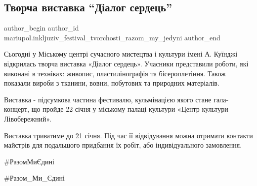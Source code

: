  
 
 
 
 

\subsection{Творча виставка \enquote{Діалог сердець}}
\label{sec:11_01_2022.fb.mariupol.inkljuziv_festival_tvorchosti_razom_my_jedyni.1.tvorcha_vistavka__d_}

\ifcmt
 author_begin
   author_id mariupol.inkljuziv_festival_tvorchosti_razom_my_jedyni
 author_end
\fi

Сьогодні у Міському центрі сучасного мистецтва і культури імені А. Куїнджі
відкрилась творча виставка «Діалог сердець». Учасники представили роботи, які
виконані в техніках: живопис, пластилінографія та бісероплетіння. Також
показали вироби з тканини, вовни, побутових та природних матеріалів.

Виставка - підсумкова частина фестивалю, кульмінацією якого стане гала-концерт,
що пройде 22 січня у міському палаці культури «Центр культури Лівобережний».

Виставка триватиме до 21 січня. Під час її відвідування можна отримати контакти
майстрів для подальшого придбання їх робіт, або індивідуального замовлення.

\#РазомМиЄдині

\#Разом\_Ми\_Єдині
